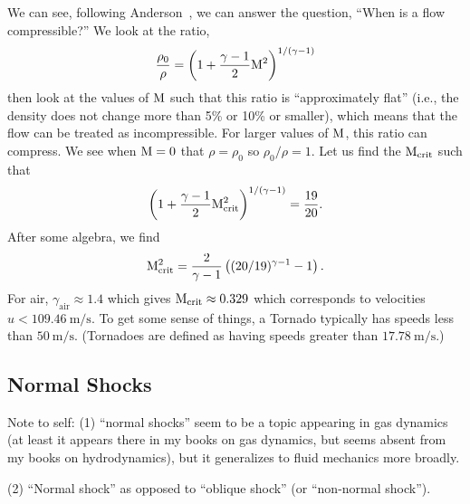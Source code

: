 \begin{aside}
We can see, following Anderson~\cite[\S8.5]{anderson1984fundamentals},
we can answer the question, ``When is a flow compressible?'' We look
at the ratio,
\begin{equation}
\frac{\rho_{0}}{\rho}=\left(1+\frac{\gamma-1}{2}\mathrm{M}^{2}\right)^{1/(\gamma-1)}
\end{equation}
then look at the values of $\mathrm{M}$ such that this ratio is
``approximately flat'' (i.e., the density does not change more than
5\% or 10\% or smaller), which means that the flow can be treated as
incompressible. For larger values of $\mathrm{M}$, this ratio can
compress. We see when $\mathrm{M}=0$ that $\rho=\rho_{0}$ so
$\rho_{0}/\rho=1$.
Let us find the $\mathrm{M}_{\text{crit}}$ such that
\begin{equation}
\left(1+\frac{\gamma-1}{2}\mathrm{M}^{2}_{\text{crit}}\right)^{1/(\gamma-1)}=\frac{19}{20}.
\end{equation}
After some algebra, we find
\begin{equation}
\mathrm{M}_{\text{crit}}^{2}=\frac{2}{\gamma-1}\left((20/19)^{\gamma-1}-1\right).
\end{equation}
For air, $\gamma_{\text{air}}\approx1.4$ which gives $\mathrm{M}_{\text{crit}}\approx0.329$
which corresponds to velocities $u<109.46~\mathrm{m}/\mathrm{s}$.
To get some sense of things, a Tornado typically has speeds less than
$50~\mathrm{m}/\mathrm{s}$. (Tornadoes are defined as having speeds
greater than $17.78~\mathrm{m}/\mathrm{s}$.)
\end{aside}

\subsection{Normal Shocks}

\begin{note}
Note to self: (1) ``normal shocks'' seem to be a topic appearing in gas
dynamics (at least it appears there in my books on gas dynamics, but
seems absent from my books on hydrodynamics), but it generalizes to
fluid mechanics more broadly.

(2) ``Normal shock'' as opposed to ``oblique shock'' (or ``non-normal shock'').
\end{note}

